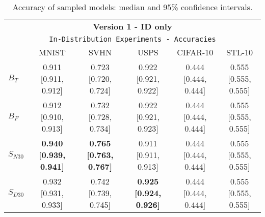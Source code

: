 \begin{table}[t]
\begin{minipage}[t]{0.98\textwidth}
\centering
{\small
\begin{tabular}{l|ccc|cc}
\toprule
\multicolumn{6}{c}{\textbf{Version 1 - ID only}}  \\
\multicolumn{6}{c}{\texttt{In-Distribution Experiments - Accuracies}}  \\
 & MNIST & SVHN & USPS & CIFAR-10 & STL-10 \\
\midrule
$B_T$ & 0.911 [0.911, 0.912] & 0.723 [0.720, 0.724] & 0.922 [0.921, 0.922] & 0.444 [0.444, 0.444] & 0.555 [0.555, 0.555]\\ 
$B_F$ & 0.912 [0.910, 0.913] & 0.732 [0.728, 0.734] & 0.922 [0.921, 0.923] & 0.444 [0.444, 0.444] & 0.555 [0.555, 0.555]\\ 
\midrule
$S_{N30}$ & \textbf{0.940 [0.939, 0.941]} & \textbf{0.765 [0.763, 0.767]} & 0.911 [0.911, 0.913] & 0.444 [0.444, 0.444] & 0.555 [0.555, 0.555]\\ 
$S_{D30}$ & 0.932 [0.931, 0.933] & 0.742 [0.739, 0.745] & \textbf{0.925 [0.924, 0.926]} & 0.444 [0.444, 0.444] & 0.555 [0.555, 0.555]\\ 
\end{tabular}
}
\caption{Accuracy of sampled models: median and 95\% confidence intervals. }
\label{tab:accuracy_static_id}
\end{minipage}
\vspace{-.2in}
\end{table}


